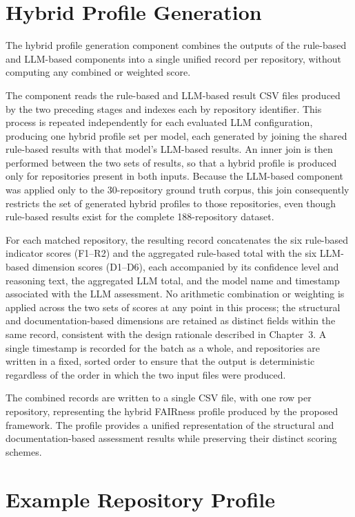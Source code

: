  \section{Hybrid Profile Generation}

The hybrid profile generation component combines the outputs of the
rule-based and LLM-based components into a single unified record per
repository, without computing any combined or weighted score.

The component reads the rule-based and LLM-based result CSV files
produced by the two preceding stages and indexes each by repository
identifier. This process is repeated independently for each evaluated 
LLM configuration, producing one hybrid profile set per model, each 
generated by joining the shared rule-based results with that model's 
LLM-based results. An inner join is then performed between the two sets of
results, so that a hybrid profile is produced only for repositories
present in both inputs. Because the LLM-based component was applied
only to the 30-repository ground truth corpus, this join
consequently restricts the set of generated hybrid profiles to those
repositories, even though rule-based results exist for the complete
188-repository dataset.

For each matched repository, the resulting record concatenates the
six rule-based indicator scores (F1--R2) and the aggregated
rule-based total with the six LLM-based dimension scores (D1--D6),
each accompanied by its confidence level and reasoning text, the
aggregated LLM total, and the model name and timestamp associated
with the LLM assessment. No arithmetic combination or weighting is
applied across the two sets of scores at any point in this process;
the structural and documentation-based dimensions are retained as
distinct fields within the same record, consistent with the design
rationale described in Chapter~3. A single timestamp is recorded for
the batch as a whole, and repositories are written in a fixed,
sorted order to ensure that the output is deterministic regardless
of the order in which the two input files were produced.

The combined records are written to a single CSV file, with one row
per repository, representing the hybrid FAIRness profile produced by
the proposed framework. The profile provides a unified representation
of the structural and documentation-based assessment results while
preserving their distinct scoring schemes.

\section{Example Repository Profile}

